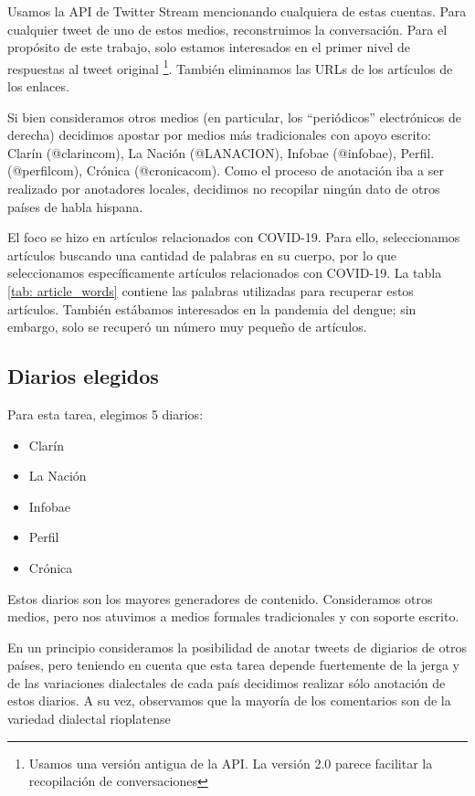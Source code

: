 

Usamos la API de Twitter Stream mencionando cualquiera de estas cuentas.  Para cualquier tweet de uno de estos medios, reconstruimos la conversación. Para el propósito de este trabajo, solo estamos interesados en el primer nivel de respuestas al tweet original \footnote{Usamos una versión antigua de la API. La versión 2.0 parece facilitar la recopilación de conversaciones}. También eliminamos las URLs de los artículos de los enlaces.


Si bien consideramos otros medios (en particular, los ``periódicos'' electrónicos de derecha) decidimos apostar por medios más tradicionales con apoyo escrito: Clarín (@clarincom), La Nación (@LANACION), Infobae (@infobae), Perfil. (@perfilcom), Crónica (@cronicacom). Como el proceso de anotación iba a ser realizado por anotadores locales, decidimos no recopilar ningún dato de otros países de habla hispana.


El foco se hizo en artículos relacionados con COVID-19. Para ello, seleccionamos artículos buscando una cantidad de palabras en su cuerpo, por lo que seleccionamos específicamente artículos relacionados con COVID-19. La tabla \ref{tab: article_words} contiene las palabras utilizadas para recuperar estos artículos. También estábamos interesados en la pandemia del dengue; sin embargo, solo se recuperó un número muy pequeño de artículos.


\subsection{Diarios elegidos}

Para esta tarea, elegimos 5 diarios:

\begin{itemize}
    \item Clarín
    \item La Nación
    \item Infobae
    \item Perfil
    \item Crónica
\end{itemize}

Estos diarios son los mayores generadores de contenido. Consideramos otros medios, pero nos atuvimos a medios formales tradicionales y con soporte escrito.

En un principio consideramos la posibilidad de anotar tweets de digiarios de otros países, pero teniendo en cuenta que esta tarea depende fuertemente de la jerga y de las variaciones dialectales de cada país decidimos realizar sólo anotación de estos diarios. A su vez, observamos que la mayoría de los comentarios son de la variedad dialectal rioplatense


